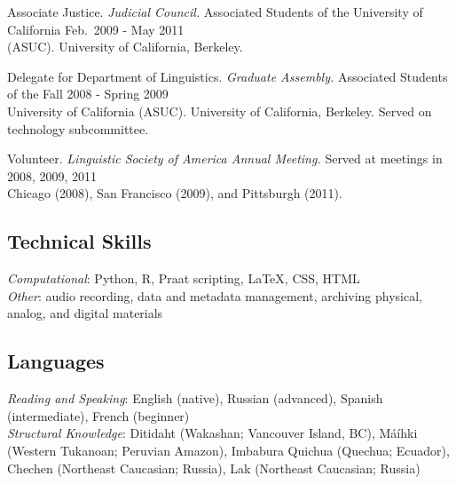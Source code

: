 \documentclass[11pt]{article}
\renewcommand{\it}[1]{\textit{#1}}
\begin{document}
\begin{reflist}
Associate Justice. \it{Judicial Council.} Associated Students of the University of California \hfill Feb.~2009 - May 2011 \\
(ASUC). University of California, Berkeley.

Delegate for Department of Linguistics. \it{Graduate Assembly.} Associated Students of the \hfill Fall 2008 - Spring 2009 \\
University of California (ASUC). University of California, Berkeley. Served on \\
technology subcommittee.

Volunteer. \it{Linguistic Society of America Annual Meeting.} Served at meetings in \hfill 2008, 2009, 2011 \\
Chicago (2008), San Francisco (2009), and Pittsburgh (2011).
\end{reflist}

\subsection*{Technical Skills}

\it{Computational}: Python, R, Praat scripting, \LaTeX, CSS, HTML \\
\it{Other}: audio recording, data and metadata management, archiving physical, analog, and digital materials

\subsection*{Languages}

\it{Reading and Speaking}: English (native), Russian (advanced), Spanish (intermediate), French (beginner) \\
\it{Structural Knowledge}: Ditidaht (Wakashan; Vancouver Island, BC), M\'a\'ih\textbari ki (Western Tukanoan; Peruvian Amazon), Imbabura Quichua (Quechua; Ecuador), Chechen (Northeast Caucasian; Russia), Lak (Northeast Caucasian; Russia)
\end{document}
